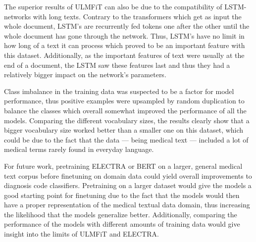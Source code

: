 The superior results of ULMFiT can also be due to the compatibility of LSTM-networks with long texts.
Contrary to the transformers which get as input the whole document, LSTM's are recurrently fed tokens one after the other until the whole document has gone through the network.
Thus, LSTM's have no limit in how long of a text it can process which proved to be an important feature with this dataset.
Additionally, as the important features of text were usually at the end of a document, the LSTM saw these features last and thus they had a relatively bigger impact on the network's parameters.


Class imbalance in the training data was suspected to be a factor for model performance, thus positive examples were upsampled by random duplication to balance the classes which overall somewhat improved the performance of all the models.
Comparing the different vocabulary sizes, the results clearly show that a bigger vocabulary size worked better than a smaller one on this dataset, which could be due to the fact that the data --- being medical text --- included a lot of medical terms rarely found in everyday language.

For future work, pretraining ELECTRA or BERT on a larger, general medical text corpus before finetuning on domain data could yield overall improvements to diagnosis code classifiers.
Pretraining on a larger dataset would give the models a good starting point for finetuning due to the fact that the models would then have a proper representation of the medical textual data domain, thus increasing the likelihood that the models generalize better.
Additionally, comparing the performance of the models with different amounts of training data would give insight into the limits of ULMFiT and ELECTRA.
